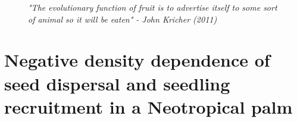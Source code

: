 \documentclass[b5paper,justified]{tufte-book} %
\begin{document}

\begin{landscape}
\begin{figure}
\vspace*{-.6cm}\hspace*{4.4cm}
\hspace*{5cm}\begin{minipage}{18cm} 
\textit{ \footnotesize "The evolutionary function of fruit is to advertise itself to some sort of animal so it will be eaten" - John Kricher (2011) \nocite{Kricher2011}}
\end{minipage}
\end{figure}
\end{landscape}

\chapter{Negative density dependence of seed dispersal and seedling recruitment in a Neotropical palm}
\label{ch3} 

\vspace*{.8cm}
\end{document}
